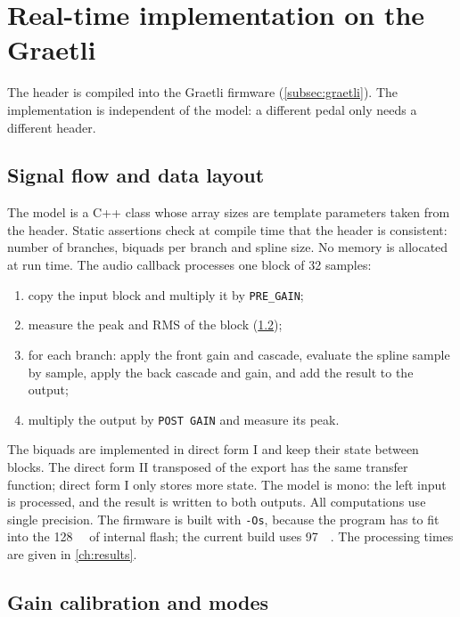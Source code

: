 \section{Real-time implementation on the Graetli}
\label{sec:impl_graetli}

The header is compiled into the Graetli firmware (\cref{subsec:graetli}). The implementation is independent of the model: a different pedal only needs a different header.

\subsection{Signal flow and data layout}
\label{subsec:impl_signal_flow}

The model is a C++ class whose array sizes are template parameters taken from the header. Static assertions check at compile time that the header is consistent: number of branches, biquads per branch and spline size. No memory is allocated at run time. The audio callback processes one block of 32 samples:
\begin{enumerate}
  \item copy the input block and multiply it by \texttt{PRE_GAIN};
  \item measure the peak and RMS of the block (\cref{subsec:impl_calibration});
  \item for each branch: apply the front gain and cascade, evaluate the spline sample by sample, apply the back cascade and gain, and add the result to the output;
  \item multiply the output by \texttt{POST GAIN} and measure its peak.
\end{enumerate}
The biquads are implemented in direct form I and keep their state between blocks. The direct form II transposed of the export has the same transfer function; direct form I only stores more state. The model is mono: the left input is processed, and the result is written to both outputs. All computations use single precision. The firmware is built with \texttt{-Os}, because the program has to fit into the \SI{128}{\kilo\byte} of internal flash; the current build uses \SI{97}{\kilo\byte}. The processing times are given in \cref{ch:results}.

\subsection{Gain calibration and modes}
\label{subsec:impl_calibration}

